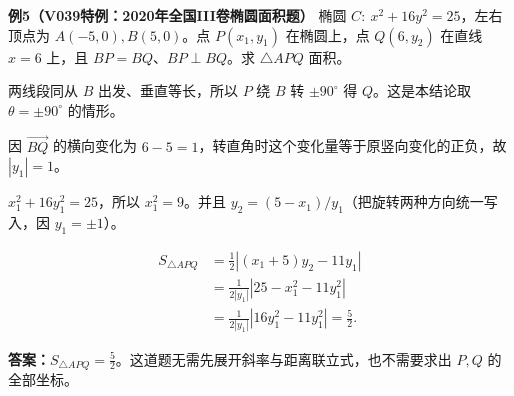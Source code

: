 \begin{examplebox}
  \textbf{\textcolor{CExample}{例5（V039特例：2020年全国III卷椭圆面积题）}}
  椭圆 $C:\ x^2+16y^2=25$，左右顶点为 $A(-5,0),B(5,0)$。点 $P(x_1,y_1)$ 在椭圆上，点 $Q(6,y_2)$ 在直线 $x=6$ 上，且 $BP=BQ$、$BP\perp BQ$。求 $\triangle APQ$ 面积。

  \begin{description}[style=nextline,leftmargin=2.8em,labelsep=0.5em,itemsep=0.33em]
    \item[\textbf{第1步（识别旋转角）}] 两线段同从 $B$ 出发、垂直等长，所以 $P$ 绕 $B$ 转 $\pm90^\circ$ 得 $Q$。这是本结论取 $\theta=\pm90^\circ$ 的情形。
    \item[\textbf{第2步（只看一个坐标消元）}] 因 $\overrightarrow{BQ}$ 的横向变化为 $6-5=1$，转直角时这个变化量等于原竖向变化的正负，故 $|y_1|=1$。
    \item[\textbf{第3步（椭圆给出另一个坐标）}] $x_1^2+16y_1^2=25$，所以 $x_1^2=9$。并且 $y_2=(5-x_1)/y_1$（把旋转两种方向统一写入，因 $y_1=\pm1$）。
    \item[\textbf{第4步（用坐标面积公式）}]
      \[
      \begin{aligned}
        S_{\triangle APQ}
        &=\frac12\left|(x_1+5)y_2-11y_1\right|\\
        &=\frac1{2|y_1|}\left|25-x_1^2-11y_1^2\right|\\
        &=\frac1{2|y_1|}\left|16y_1^2-11y_1^2\right|=\frac52.
      \end{aligned}
      \]
  \end{description}
  \textbf{答案：}$\boxed{S_{\triangle APQ}=\frac52}$。这道题无需先展开斜率与距离联立式，也不需要求出 $P,Q$ 的全部坐标。
\end{examplebox}
